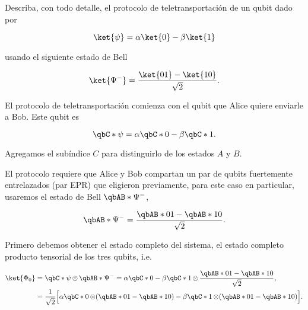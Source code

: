 \documentclass[./../main.tex]{subfiles}
\begin{document}

    \section{}

    Describa, con todo detalle, el protocolo de teletransportación de un qubit dado por

    \begin{equation*}
        \ket{\psi} = \alpha\ket{0} - \beta\ket{1}
    \end{equation*}

    usando el siguiente estado de Bell

    \begin{equation*}
        \ket{\Psi^{-}} = \dfrac{\ket{01} - \ket{10}}{\sqrt{2}}.
    \end{equation*}

    \startsolution

    El protocolo de teletransportación comienza con el qubit que Alice quiere enviarle a Bob. Este qubit es

    \begin{equation*}
        \qbC*{\psi} = \alpha\qbC*{0} - \beta\qbC*{1}.
    \end{equation*}

    Agregamos el subíndice \(C\) para distinguirlo de los estados \(A\) y \(B\).

    El protocolo requiere que Alice y Bob compartan un par de qubits fuertemente entrelazados (par EPR) que eligieron previamente, para este caso en particular, usaremos el estado de Bell \(\qbAB*{\Psi^{-}}\),

    \begin{equation*}
        \qbAB*{\Psi^{-}} = \dfrac{\qbAB*{01} - \qbAB*{10}}{\sqrt{2}}.
    \end{equation*}

    Primero debemos obtener el estado completo del sistema, el estado completo producto tensorial de los tres qubits, i.e.

    \begin{align*}
        \ket{\Phi_{0}} &= \tensprod{\qbC*{\psi}}{\qbAB*{\Psi^{-}}} = \tensprod{\alpha\qbC*{0} - \beta\qbC*{1}}{\dfrac{\qbAB*{01} - \qbAB*{10}}{\sqrt{2}}},\\
        &= \dfrac{1}{\sqrt{2}}\Bigl[\tensprod{\alpha\qbC*{0}}{(\qbAB*{01} - \qbAB*{10})} - \tensprod{\beta\qbC*{1}}{(\qbAB*{01} - \qbAB*{10})}\Bigr].
    \end{align*}
\end{document}
